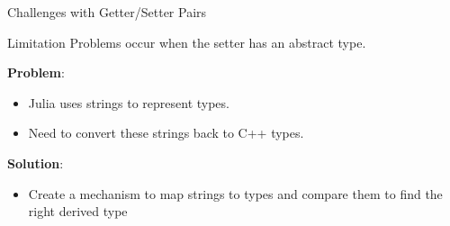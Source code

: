 \begin{frame}{Challenges with Getter/Setter Pairs}
    \begin{block}{Limitation} 
        Problems occur when the setter has an abstract type.
    \end{block}

    \textbf{Problem}:
    \begin{itemize}
        \item Julia uses strings to represent types.
        \item Need to convert these strings back to C++ types.
    \end{itemize}

    \textbf{Solution}:
    \begin{itemize}
        \item Create a mechanism to map strings to types and compare them to find the right derived type
    \end{itemize}
\end{frame}
